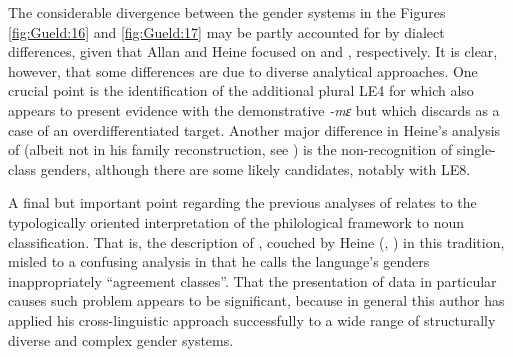 \documentclass[output=collectionpaper]{langsci/langscibook}
\begin{document}
The considerable divergence between the gender systems in the Figures \ref{fig:Gueld:16} and \ref{fig:Gueld:17} may be partly accounted for by dialect differences, given that Allan and Heine focused on  and , respectively. It is clear, however, that some differences are due to diverse analytical approaches. One crucial point is the identification of the additional plural LE4 for which \citet[115]{Heine1968} also appears to present evidence with the demonstrative \textit{-mɛ} but which \citet[173]{Corbett1991} discards as a case of an overdifferentiated target. Another major difference in Heine's analysis of  (albeit not in his family reconstruction, see ) is the non-recognition of single-class genders, although there are some likely candidates, notably with LE8.

A final but important point regarding the previous analyses of  relates to the typologically oriented interpretation of the philological framework to  noun classification. That is, the description of , couched by Heine (\citeyear{Heine1968}, \citeyear{Heine1982}) in this tradition, misled \citet[173--175]{Corbett1991} to a confusing analysis in that he calls the language's genders inappropriately ``agreement classes''. That the presentation of  data in particular causes such problem appears to be significant, because in general this author has applied his cross-linguistic approach successfully to a wide range of structurally diverse and complex gender systems.
\end{document}
